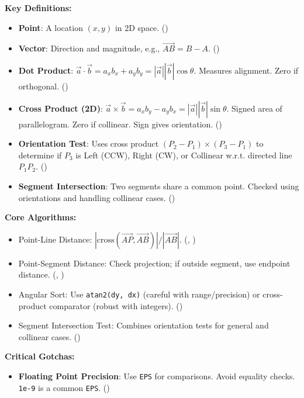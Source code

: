 \begin{summarycard}
\label{summary:A}
\textbf{Key Definitions:}
\begin{itemize}
    \item \textbf{Point}: A location $(x,y)$ in 2D space. ()
    \item \textbf{Vector}: Direction and magnitude, e.g., $\vec{AB} = B - A$. ()
    \item \textbf{Dot Product}: $\vec{a} \cdot \vec{b} = a_x b_x + a_y b_y = |\vec{a}||\vec{b}|\cos\theta$. Measures alignment. Zero if orthogonal. ()
    \item \textbf{Cross Product (2D)}: $\vec{a} \times \vec{b} = a_x b_y - a_y b_x = |\vec{a}||\vec{b}|\sin\theta$. Signed area of parallelogram. Zero if collinear. Sign gives orientation. ()
    \item \textbf{Orientation Test}: Uses cross product $(P_2-P_1) \times (P_3-P_1)$ to determine if $P_3$ is Left (CCW), Right (CW), or Collinear w.r.t. directed line $P_1P_2$. ()
    \item \textbf{Segment Intersection}: Two segments share a common point. Checked using orientations and handling collinear cases. ()
\end{itemize}
\textbf{Core Algorithms:}
\begin{itemize}
    \item Point-Line Distance: $|\text{cross}(\vec{AP}, \vec{AB})| / |\vec{AB}|$. (, )
    \item Point-Segment Distance: Check projection; if outside segment, use endpoint distance. (, )
    \item Angular Sort: Use \texttt{atan2(dy, dx)} (careful with range/precision) or cross-product comparator (robust with integers). ()
    \item Segment Intersection Test: Combines orientation tests for general and collinear cases. ()
\end{itemize}
\textbf{Critical Gotchas:}
\begin{itemize}
    \item \textbf{Floating Point Precision}: Use \texttt{EPS} for comparisons. Avoid equality checks. \texttt{1e-9} is a common \texttt{EPS}. ()

\end{itemize}
\end{summarycard}
